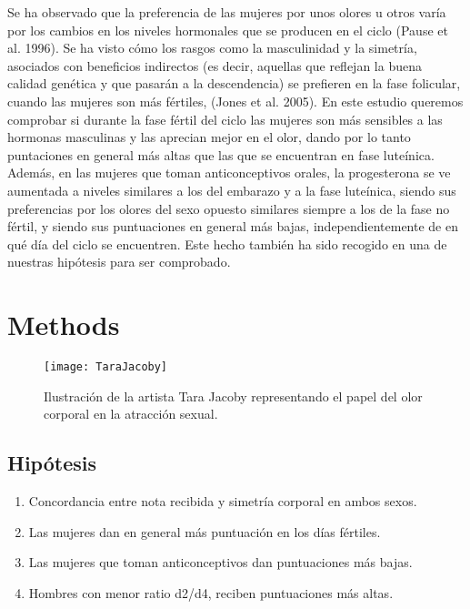 \documentclass[fleqn,10pt]{SelfArx} %
\begin{document}
Se ha observado que la preferencia de las mujeres por unos olores u otros varía por los cambios en los niveles hormonales que se producen en el ciclo (Pause et al. 1996). Se ha visto cómo los rasgos como la masculinidad y la simetría, asociados con beneficios indirectos (es decir, aquellas que reflejan la buena calidad genética y que pasarán a la descendencia) se prefieren en la fase folicular, cuando las mujeres son más fértiles, (Jones et al. 2005). En este estudio queremos comprobar si durante la fase fértil del ciclo las mujeres son más sensibles a las hormonas masculinas y las aprecian mejor en el olor, dando por lo tanto puntaciones en general más altas que las que se encuentran en fase luteínica. Además, en las mujeres que toman anticonceptivos orales, la progesterona se ve aumentada a niveles similares a los del embarazo y a la fase luteínica, siendo sus preferencias por los olores del sexo opuesto similares siempre a los de la fase no fértil, y siendo sus puntuaciones en general más bajas, independientemente de en qué día del ciclo se encuentren. Este hecho también ha sido recogido en una de nuestras hipótesis para ser comprobado.


\section{Methods}

\begin{figure*}[ht]\centering %
	\texttt{[image: TaraJacoby]}
	\caption{Ilustración de la artista Tara Jacoby representando el papel del olor corporal en la atracción sexual.}
	\label{fig:Tara Jacoby}
\end{figure*}

\subsection{Hipótesis}

\begin{enumerate}[noitemsep] %
	\item Concordancia entre nota recibida y simetría corporal en ambos sexos.
	\item Las mujeres dan en general más puntuación en los días fértiles.
	\item Las mujeres que toman anticonceptivos dan puntuaciones más bajas.
	\item Hombres con menor ratio d2/d4, reciben puntuaciones más altas.
\end{enumerate}
\end{document}
